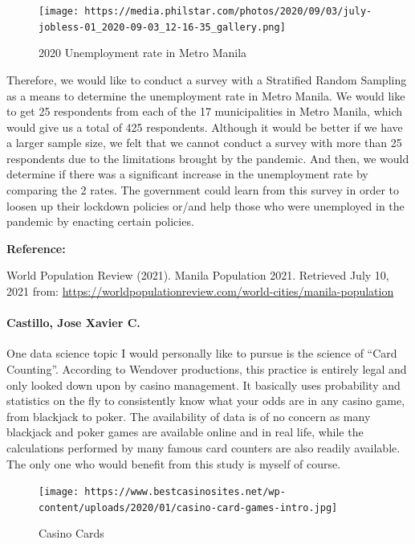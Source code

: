 \documentclass[
]{article}
\begin{document}
\begin{figure}
\centering
\texttt{[image: https://media.philstar.com/photos/2020/09/03/july-jobless-01\_2020-09-03\_12-16-35\_gallery.png]}
\caption{2020 Unemployment rate in Metro Manila}
\end{figure}

Therefore, we would like to conduct a survey with a Stratified Random
Sampling as a means to determine the unemployment rate in Metro Manila.
We would like to get 25 respondents from each of the 17 municipalities
in Metro Manila, which would give us a total of 425 respondents.
Although it would be better if we have a larger sample size, we felt
that we cannot conduct a survey with more than 25 respondents due to the
limitations brought by the pandemic. And then, we would determine if
there was a significant increase in the unemployment rate by comparing
the 2 rates. The government could learn from this survey in order to
loosen up their lockdown policies or/and help those who were unemployed
in the pandemic by enacting certain policies.

\textbf{Reference:}

World Population Review (2021). Manila Population 2021. Retrieved July
10, 2021 from:
\url{https://worldpopulationreview.com/world-cities/manila-population}

\hypertarget{castillo-jose-xavier-c.}{%
\paragraph{Castillo, Jose Xavier C.}\label{castillo-jose-xavier-c.}}

One data science topic I would personally like to pursue is the science
of ``Card Counting''. According to Wendover productions, this practice
is entirely legal and only looked down upon by casino management. It
basically uses probability and statistics on the fly to consistently
know what your odds are in any casino game, from blackjack to poker. The
availability of data is of no concern as many blackjack and poker games
are available online and in real life, while the calculations performed
by many famous card counters are also readily available. The only one
who would benefit from this study is myself of course.

\begin{figure}
\centering
\texttt{[image: https://www.bestcasinosites.net/wp-content/uploads/2020/01/casino-card-games-intro.jpg]}
\caption{Casino Cards}
\end{figure}
\end{document}
